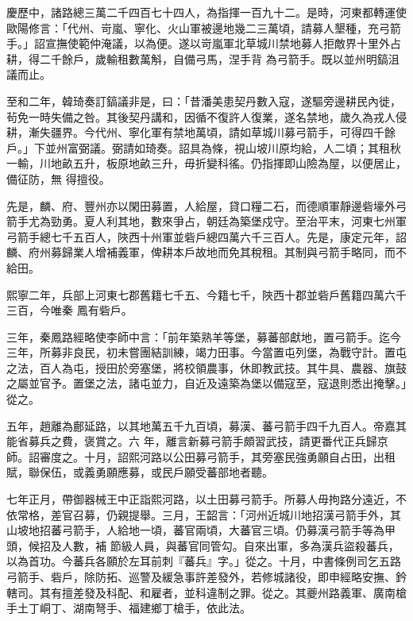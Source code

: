 \begin{pinyinscope}
 慶歷中，諸路總三萬二千四百七十四人，為指揮一百九十二。是時，河東都轉運使歐陽修言：「代州、岢嵐、寧化、火山軍被邊地幾二三萬頃，請募人墾種，充弓箭手。」詔宣撫使範仲淹議，以為便。遂以岢嵐軍北草城川禁地募人拒敵界十里外占耕，得二千餘戶，歲輸租數萬斛，自備弓馬，涅手背
 為弓箭手。既以並州明鎬沮議而止。



 至和二年，韓琦奏訂鎬議非是，曰：「昔潘美患契丹數入寇，遂驅旁邊耕民內徙，茍免一時失備之咎。其後契丹講和，因循不復許人復業，遂名禁地，歲久為戎人侵耕，漸失疆界。今代州、寧化軍有禁地萬頃，請如草城川募弓箭手，可得四千餘戶。」下並州富弼議。弼請如琦奏。詔具為條，視山坡川原均給，人二頃；其租秋一輸，川地畝五升，板原地畝三升，毋折變科徭。仍指揮即山險為屋，以便居止，備征防，無
 得擅役。



 先是，麟、府、豐州亦以閑田募置，人給屋，貸口糧二石，而德順軍靜邊砦壕外弓箭手尤為勁勇。夏人利其地，數來爭占，朝廷為築堡戍守。至治平末，河東七州軍弓箭手總七千五百人，陜西十州軍並砦戶總四萬六千三百人。先是，康定元年，詔麟、府州募歸業人增補義軍，俾耕本戶故地而免其稅租。其制與弓箭手略同，而不給田。



 熙寧二年，兵部上河東七郡舊籍七千五、今籍七千，陜西十郡並砦戶舊籍四萬六千三百，今唯秦
 鳳有砦戶。



 三年，秦鳳路經略使李師中言：「前年築熟羊等堡，募蕃部獻地，置弓箭手。迄今三年，所募非良民，初未嘗團結訓練，竭力田事。今當置屯列堡，為戰守計。置屯之法，百人為屯，授田於旁塞堡，將校領農事，休即教武技。其牛具、農器、旗鼓之屬並官予。置堡之法，諸屯並力，自近及遠築為堡以備寇至，寇退則悉出掩擊。」從之。



 五年，趙離為鄜延路，以其地萬五千九百頃，募漢、蕃弓箭手四千九百人。帝嘉其能省募兵之費，褒賞之。六
 年，離言新募弓箭手頗習武技，請更番代正兵歸京師。詔審度之。十月，詔熙河路以公田募弓箭手，其旁塞民強勇願自占田，出租賦，聯保伍，或義勇願應募，或民戶願受蕃部地者聽。



 七年正月，帶御器械王中正詣熙河路，以土田募弓箭手。所募人毋拘路分遠近，不依常格，差官召募，仍親提舉。三月，王韶言：「河州近城川地招漢弓箭手外，其山坡地招蕃弓箭手，人給地一頃，蕃官兩頃，大蕃官三頃。仍募漢弓箭手等為甲頭，候招及人數，補
 節級人員，與蕃官同管勾。自來出軍，多為漢兵盜殺蕃兵，以為首功。今蕃兵各願於左耳前刺『蕃兵』字。」從之。十月，中書條例司乞五路弓箭手、砦戶，除防拓、巡警及緩急事許差發外，若修城諸役，即申經略安撫、鈐轄司。其有擅差發及科配、和雇者，並科違制之罪。從之。其夔州路義軍、廣南槍手土丁峒丁、湖南弩手、福建鄉丁槍手，依此法。




\end{pinyinscope}
